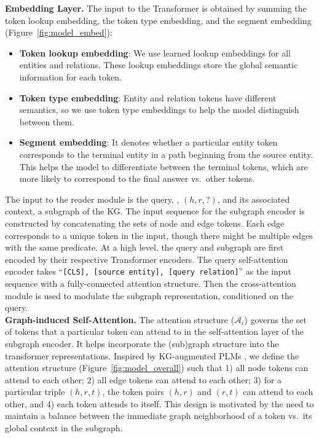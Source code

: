 \noindent \textbf{Embedding Layer.}
The input to the Transformer is obtained by summing the token lookup embedding, the token type embedding, and the segment embedding (Figure~\ref{fig:model_embed}):
\begin{itemize}
\item \textbf{Token lookup embedding}: We use learned lookup embeddings for all entities and relations. These lookup embeddings store the global semantic information for each token.
    \item \textbf{Token type embedding}: Entity and relation tokens have different semantics, so we use token type embeddings to help the model distinguish between them.
    \item \textbf{Segment embedding}: It denotes whether a particular entity token corresponds to the terminal entity in a path beginning from the source entity. This helps the model to differentiate between the terminal tokens, which are more likely to correspond to the final answer vs.\ other tokens.
\end{itemize}
The input to the reader module is the query, \eg, $(h, r, ?)$, and its associated context, a subgraph of the KG\@. The input sequence for the subgraph encoder is constructed by concatenating the sets of node and edge tokens.
Each edge corresponds to a unique token in the input, though there might be multiple edges with the same predicate.
At a high level, the query and subgraph are first encoded by their respective Transformer encoders.  The query self-attention encoder takes ``\texttt{[CLS], [source entity], [query relation]}'' as the input sequence with a fully-connected attention structure. Then the cross-attention module is used to modulate the subgraph representation, conditioned on the query.\\

\noindent \textbf{Graph-induced Self-Attention.} The attention structure ($\mathcal{A}_i$) governs the set of tokens that a particular token can attend to in the self-attention layer of the subgraph encoder. It helps incorporate the (sub)graph structure into the transformer representations.
Inspired by KG-augmented PLMs \cite{he-etal-2020-bert, he2021klmo}, we define the attention structure (Figure~\ref{fig:model_overall}) such that 1) all node tokens can attend to each other; 2) all edge tokens can attend to each other; 3) for a particular triple $(h, r, t)$, the token pairs $(h, r)$ and $(r, t)$ can attend to each other, and 4) each token attends to itself. This design is motivated by the need to maintain a balance between the immediate graph neighborhood of a token vs.\ its global context in the subgraph.

